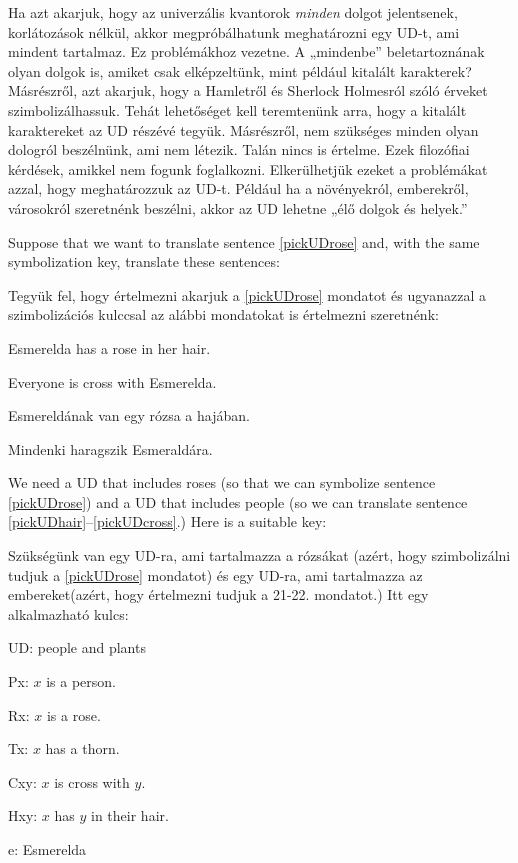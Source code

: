 Ha azt akarjuk, hogy az univerzális kvantorok \emph{minden} dolgot jelentsenek, korlátozások nélkül, akkor megpróbálhatunk meghatározni egy UD-t, ami mindent tartalmaz. Ez problémákhoz vezetne. A „mindenbe” beletartoznának olyan dolgok is, amiket csak elképzeltünk, mint például kitalált karakterek? Másrészről, azt akarjuk, hogy a Hamletről és Sherlock Holmesról szóló érveket szimbolizálhassuk. Tehát lehetőséget kell teremtenünk arra, hogy a kitalált karaktereket az UD részévé tegyük. Másrészről, nem szükséges minden olyan dologról beszélnünk, ami nem létezik. Talán nincs is értelme. Ezek filozófiai kérdések, amikkel nem fogunk foglalkozni. Elkerülhetjük ezeket a problémákat azzal, hogy meghatározzuk az UD-t. Például ha a növényekról, emberekről, városokról szeretnénk beszélni, akkor az UD lehetne „élő dolgok és helyek.”

Suppose that we want to translate sentence \ref{pickUDrose} and, with the same symbolization key, translate these sentences:

Tegyük fel, hogy értelmezni akarjuk a \ref{pickUDrose} mondatot és ugyanazzal a szimbolizációs kulccsal az alábbi mondatokat is értelmezni szeretnénk:

\begin{earg}
\item[\ex{pickUDhair}] Esmerelda has a rose in her hair.
\item[\ex{pickUDcross}] Everyone is cross with Esmerelda.
\end{earg}

\begin{earg}
\item[\ex{pickUDhair}] Esmereldának van egy rózsa a hajában.
\item[\ex{pickUDcross}] Mindenki haragszik Esmeraldára.
\end{earg}

We need a UD that includes roses (so that we can symbolize sentence \ref{pickUDrose}) and a UD that includes people (so we can translate sentence \ref{pickUDhair}--\ref{pickUDcross}.) Here is a suitable key:

Szükségünk van egy UD-ra, ami tartalmazza a rózsákat (azért, hogy szimbolizálni tudjuk a \ref{pickUDrose} mondatot) és egy UD-ra, ami tartalmazza az embereket(azért, hogy értelmezni tudjuk a 21-22. mondatot.) Itt egy alkalmazható kulcs:

\begin{ekey}
\item[UD:] people and plants
\item[Px:] $x$ is a person.
\item[Rx:] $x$ is a rose.
\item[Tx:] $x$ has a thorn.
\item[Cxy:] $x$ is cross with $y$.
\item[Hxy:] $x$ has $y$ in their hair.
\item[e:] Esmerelda
\end{ekey}

